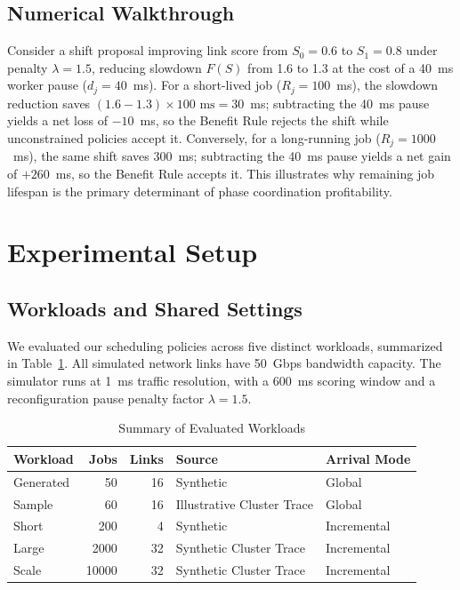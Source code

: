 \documentclass[conference]{IEEEtran}
\begin{document}
\subsection{Numerical Walkthrough}

Consider a shift proposal improving link score from $S_0 = 0.6$ to $S_1 = 0.8$ under penalty $\lambda = 1.5$, reducing slowdown $F(S)$ from 1.6 to 1.3 at the cost of a 40~ms worker pause ($d_j = 40$~ms). For a short-lived job ($R_j = 100$~ms), the slowdown reduction saves $(1.6 - 1.3) \times 100\text{ ms} = 30$~ms; subtracting the 40~ms pause yields a net loss of $-10$~ms, so the Benefit Rule rejects the shift while unconstrained policies accept it. Conversely, for a long-running job ($R_j = 1000$~ms), the same shift saves 300~ms; subtracting the 40~ms pause yields a net gain of $+260$~ms, so the Benefit Rule accepts it.
This illustrates why remaining job lifespan is the primary determinant of phase coordination profitability.

\section{Experimental Setup}
\label{sec:setup}

\subsection{Workloads and Shared Settings}

We evaluated our scheduling policies across five distinct workloads, summarized in Table~\ref{tab:workloads}. All simulated network links have 50~Gbps bandwidth capacity. The simulator runs at 1~ms traffic resolution, with a 600~ms scoring window and a reconfiguration pause penalty factor $\lambda = 1.5$.

\begin{table}[t]
\caption{Summary of Evaluated Workloads}
\label{tab:workloads}
\centering
\begin{tabular}{lrrll}
\hline
Workload & Jobs & Links & Source & Arrival Mode \\
\hline
Generated & 50 & 16 & Synthetic & Global \\
Sample & 60 & 16 & Illustrative Cluster Trace & Global \\
Short & 200 & 4 & Synthetic & Incremental \\
Large & 2000 & 32 & Synthetic Cluster Trace & Incremental \\
Scale & 10000 & 32 & Synthetic Cluster Trace & Incremental \\
\hline
\end{tabular}
\end{table}
\end{document}
